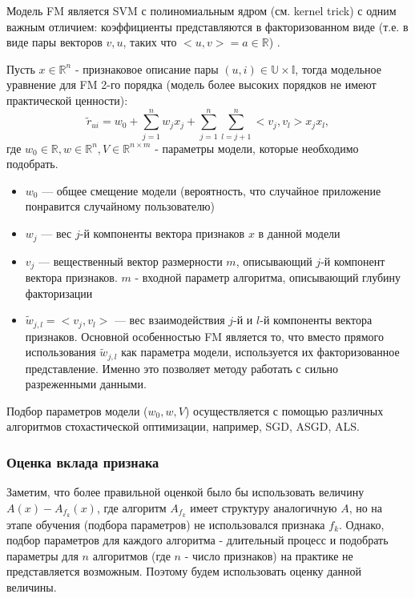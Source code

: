 \documentclass[12pt,a4paper]{report}
\begin{document}
Модель FM является SVM с полиномиальным ядром (см. kernel trick) с одним важным отличием: коэффициенты представляются в факторизованном виде (т.е. в виде пары векторов $v, u$, таких что $<u,v> = a \in \mathbb{R}$) \cite{Fm}.

Пусть $x \in \mathbb{R}^n$ - признаковое описание пары $(u, i) \in \mathbb{U}\times\mathbb{I}$, тогда модельное уравнение для FM 2-го порядка (модель более высоких порядков не имеют практической ценности):
\begin{equation}
\tilde{r}_{ui} = w_0 + \sum_{j=1}^{n}w_jx_j + \sum_{j=1}^{n}\sum_{l=j+1}^{n}<v_j, v_l>x_jx_l,
\end{equation}
где $w_0 \in \mathbb{R}, w \in \mathbb{R}^n, V \in \mathbb{R}^{n \times m}$ - параметры модели, которые необходимо подобрать.
\begin{itemize}
\item $w_0$ --- общее смещение модели (вероятность, что случайное приложение понравится случайному пользователю)
\item $w_j$ --- вес $j$-й компоненты вектора признаков $x$ в данной модели
\item $v_j$ --- вещественный вектор размерности $m$, описывающий $j$-й компонент вектора признаков. $m$ -  входной параметр алгоритма, описывающий глубину факторизации
\item $\tilde{w}_{j,l} = <v_j, v_l>$ --- вес взаимодействия $j$-й и $l$-й компоненты вектора признаков. Основной особенностью FM является то, что вместо прямого использования $\tilde{w}_{j,l}$ как параметра модели, используется их факторизованное представление. Именно это позволяет методу работать с сильно разреженными данными.
\end{itemize}

Подбор параметров модели ($w_0, w, V$) осуществляется с помощью различных алгоритмов стохастической оптимизации, например, SGD, ASGD, ALS.

\subsubsection{Оценка вклада признака}
Заметим, что более правильной оценкой было бы использовать величину $A(x) - A_{f_k}(x)$, где алгоритм $A_{f_k}$ имеет структуру аналогичную $A$, но на этапе обучения (подбора параметров) не использовался признака $f_k$. Однако, подбор параметров для каждого алгоритма - длительный процесс и подобрать параметры для $n$ алгоритмов (где $n$ - число признаков) на практике не представляется возможным. Поэтому будем использовать оценку данной величины.
\end{document}
